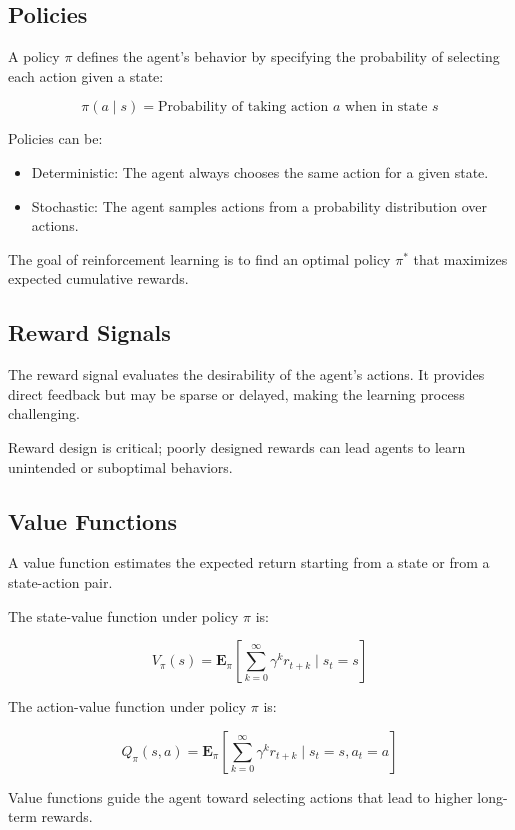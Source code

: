 \documentclass[openany]{book}
\begin{document}
\subsection{Policies}

A policy \( \pi \) defines the agent's behavior by specifying the probability of 
selecting each action given a state:

\[
\pi(a \mid s) = \text{Probability of taking action } a \text{ when in state } s
\]

Policies can be:

\begin{itemize}
    \item Deterministic: The agent always chooses the same action for a given 
    state.
    \item Stochastic: The agent samples actions from a probability distribution 
    over actions.
\end{itemize}

The goal of reinforcement learning is to find an optimal policy \( \pi^* \) that 
maximizes expected cumulative rewards.

\subsection{Reward Signals}

The reward signal evaluates the desirability of the agent's actions. It provides 
direct feedback but may be sparse or delayed, making the learning process 
challenging.

Reward design is critical; poorly designed rewards can lead agents to learn 
unintended or suboptimal behaviors.

\subsection{Value Functions}

A value function estimates the expected return starting from a state or from a 
state-action pair.

The state-value function under policy \( \pi \) is:

\[
V_\pi(s) = \mathbf{E}_\pi \left[ \sum_{k=0}^{\infty} \gamma^k r_{t+k} 
\mid s_t = s \right]
\]

The action-value function under policy \( \pi \) is:

\[
Q_\pi(s, a) = \mathbf{E}_\pi \left[ \sum_{k=0}^{\infty} \gamma^k r_{t+k} 
\mid s_t = s, a_t = a \right]
\]

Value functions guide the agent toward selecting actions that lead to higher 
long-term rewards.
\end{document}
